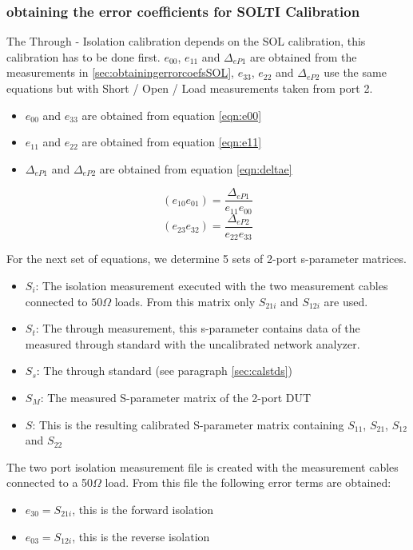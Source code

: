 \subsubsection{obtaining the error coefficients for SOLTI Calibration}
\label{sec:obtainingsolti}
The Through - Isolation calibration depends on the SOL calibration, this calibration has to be done first. 
$e_{00}$, $e_{11}$ and $\Delta_{eP1}$ are obtained from the measurements in \ref{sec:obtainingerrorcoefsSOL}, $e_{33}$, $e_{22}$ and $\Delta_{eP2}$ use the same equations but with Short / Open / Load measurements taken from port 2.
\begin{itemize}
	\item {$e_{00}$ and $e_{33}$ are obtained from equation \ref{eqn:e00}}
	\item {$e_{11}$ and $e_{22}$ are obtained from equation \ref{eqn:e11}}	
	\item {$\Delta_{eP1}$ and $\Delta_{eP2}$ are obtained from equation \ref{eqn:deltae}}
\end{itemize}

\begin{equation}
(e_{10}e_{01}) = \frac{\Delta_{eP1}}{e_{11}e_{00}}
\end{equation}
\begin{equation}
(e_{23}e_{32}) = \frac{\Delta_{eP2}}{e_{22}e_{33}}
\end{equation}

For the next set of equations, we determine 5 sets of 2-port s-parameter matrices.
\begin{itemize}
	\item {$S_i$: The isolation measurement executed with the two measurement cables connected to $50\Omega$ loads. From this matrix only $S_{21i}$ and $S_{12i}$ are used.}
	\item {$S_t$: The through measurement, this s-parameter contains data of the measured through standard with the uncalibrated network analyzer.}
	\item {$S_s$: The through standard (see paragraph \ref{sec:calstds})}
	\item {$S_M$: The measured S-parameter matrix of the 2-port DUT}
	\item {$S$: This is the resulting calibrated S-parameter matrix containing $S_{11}$, $S_{21}$, $S_{12}$ and $S_{22}$}
	
\end{itemize}
The two port isolation measurement file is created with the measurement cables connected to a 50$\Omega$ load. From this file the following error terms are obtained:
\begin{itemize}
	\item $e_{30} = S_{21i}$, this is the forward isolation
	\item $e_{03} = S_{12i}$, this is the reverse isolation
\end{itemize}



